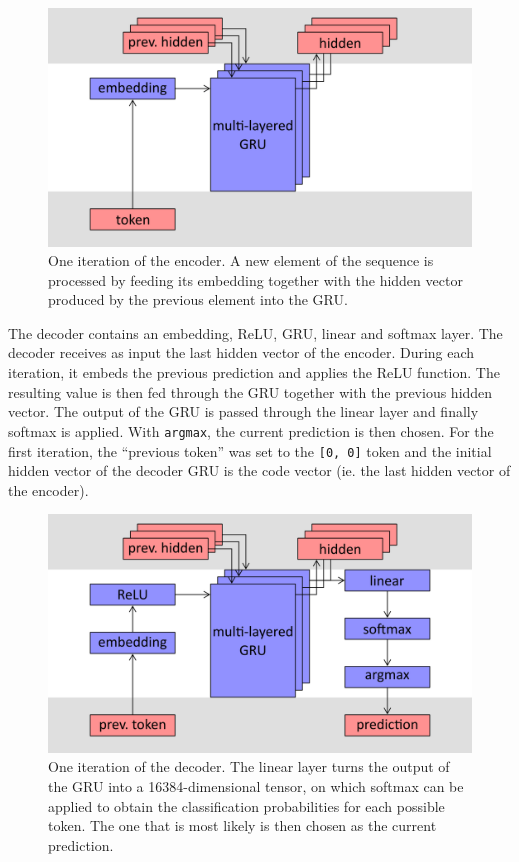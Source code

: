 \documentclass[a4paper]{article}
\begin{document}
\begin{figure}[h!]
  \includegraphics[width=\textwidth]{model/encoder}
  \caption{One iteration of the encoder. A new element of the sequence is processed by feeding its embedding together with the hidden vector produced by the previous element into the GRU.}
  \label{enc}
\end{figure}

The decoder contains an embedding, ReLU, GRU, linear and softmax layer. The decoder receives as input the last hidden vector of the encoder. During each iteration, it embeds the previous prediction and applies the ReLU function. The resulting value is then fed through the GRU together with the previous hidden vector. The output of the GRU is passed through the linear layer and finally softmax is applied. With \texttt{argmax}, the current prediction is then chosen. For the first iteration, the ``previous token'' was set to the \texttt{[0, 0]} token and the initial hidden vector of the decoder GRU is the code vector (ie. the last hidden vector of the encoder).
\begin{figure}[h!]
  \includegraphics[width=\textwidth]{model/decoder}
  \caption{One iteration of the decoder. The linear layer turns the output of the GRU into a 16384-dimensional tensor, on which softmax can be applied to obtain the classification probabilities for each possible token. The one that is most likely is then chosen as the current prediction.}
  \label{dec}
\end{figure}
\end{document}
